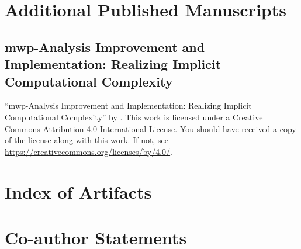 \backmatter
\printbibliography[label=chap:references, title=References]
\let\printbibliography\relax

\appendix

\chapter{Additional Published Manuscripts}\label{additional-manuscripts}
\clearpage

    \section{mwp-Analysis Improvement and Implementation: Realizing Implicit
    Computational Complexity}\label{sec:fscd}
    \pageIconAnalysis
    {\par\enquote{mwp-Analysis Improvement and Implementation: Realizing Implicit Computational Complexity}
    \textcopyright{ }by{ }\CTNT.
    \newline{}This work is licensed under a Creative Commons Attribution 4.0 International License.
    \newline{}You should have received a copy of the license along with this work.
    \newline{}If not, see \url{https://creativecommons.org/licenses/by/4.0/}.}
    
    \clearpage

\chapter{Index of Artifacts}\label{app:sec:artifacts}

\clearpage

\chapter{Co-author Statements}\label{app:sec:coauth}

\clearpage

\pagestyle{plain}
\printglossary[type=\acronymtype,nonumberlist,title={Index of Acronyms},style=longragged]
\clearpage

\pagestyle{plain}
\printglossary[type=symbols]
\clearpage

\printindex